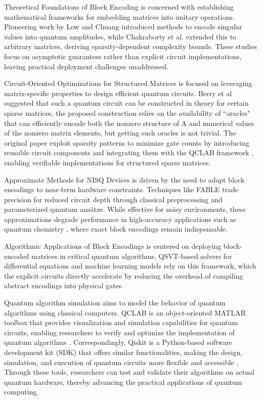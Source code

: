 \documentclass{article}
\begin{document}
\label{sec:related_works}

Theoretical Foundations of Block Encoding is concerned with establishing mathematical frameworks for embedding matrices into unitary operations. Pioneering work by Low and Chuang\cite{low2017optimal}
introduced methods to encode singular values into quantum amplitudes, while Chakraborty et al.\cite{chakraborty2018power}
extended this to arbitrary matrices, deriving sparsity-dependent complexity bounds. These studies focus on asymptotic guarantees rather than explicit circuit implementations, leaving practical deployment challenges unaddressed.

Circuit-Oriented Optimizations for Structured Matrices is focused on leveraging matrix-specific properties to design efficient quantum circuits.
Berry et al \cite{berry2015hamiltonian} suggested that such a quantum circuit can
be constructed in theory for certain sparse matrices, the proposed construction relies on the availability of “oracles" that
can efficiently encode both the nonzero structure of A and numerical values of the nonzero matrix elements, but getting such oracles is not trivial.
The original paper exploit sparsity patterns to minimize gate counts by introducing reusable circuit components and integrating them with the QCLAB framework
, enabling verifiable implementations for structured sparse matrices.

Approximate Methods for NISQ Devices is driven by the need to adapt block encodings to near-term hardware constraints. Techniques like FABLE \cite{camps2022fable}
trade precision for reduced circuit depth through classical preprocessing and parameterized quantum ansätze. While effective for noisy environments, these approximations degrade performance in high-accuracy applications such as quantum chemistry
, where exact block encodings remain indispensable.

Algorithmic Applications of Block Encodings is centered on deploying block-encoded matrices in critical quantum algorithms. QSVT-based solvers \cite{Gilyen2019}for differential equations
and machine learning models rely on this framework, which the explicit circuits directly accelerate by reducing the overhead of compiling abstract encodings into physical gates.

Quantum algorithm simulation aims to model the behavior of quantum algorithms using classical computers.
QCLAB \cite{keip2025qclab} is an object-oriented MATLAB toolbox that provides visualization and simulation capabilities for quantum circuits, enabling researchers to verify and optimize the implementation of quantum algorithms .
Correspondingly, Qiskit\cite{wille2019ibm} is a Python-based software development kit (SDK) that offers similar functionalities, making the design, simulation, and execution of quantum circuits more flexible and accessible .
Through these tools, researchers can test and validate their algorithms on actual quantum hardware, thereby advancing the practical applications of quantum computing.
\end{document}
